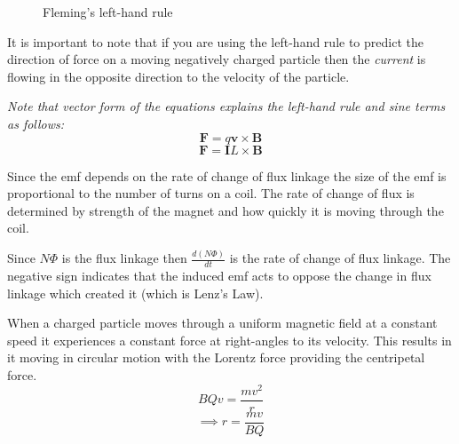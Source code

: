 \documentclass[main.tex]{subfiles}
\begin{document}
\begin{figure}[ht]
  \begin{center}
  \end{center}
  \caption{Fleming's left-hand rule}
  \label{flemminglh}
\end{figure}

It is important to note that if you are using the left-hand rule to predict the direction of force on a moving negatively charged particle then the \emph{current} is flowing in the opposite direction to the velocity of the particle.

\emph{Note that vector form of the equations explains the left-hand rule and sine terms as follows:}
$$\mathbf{F} = q\mathbf{v}\times\mathbf{B}$$
$$\mathbf{F} = \mathbf{I}L\times\mathbf{B}$$


Since the emf depends on the rate of change of flux linkage the size of the emf is proportional to the number of turns on a coil. The rate of change of flux is determined by strength of the magnet and how quickly it is moving through the coil.
\newpage
{}

Since $N\Phi$ is the flux linkage then $\frac{d(N\Phi)}{dt}$ is the rate of change of flux linkage. The negative sign indicates that the induced emf acts to oppose the change in flux linkage which created it (which is Lenz's Law).


When a charged particle moves through a uniform magnetic field at a constant speed it experiences a constant force at right-angles to its velocity. This results in it moving in circular motion with the Lorentz force providing the centripetal force.
\[ BQv = \frac{mv^2}{r} \]
\[\implies r = \frac{mv}{BQ} \]
\end{document}
